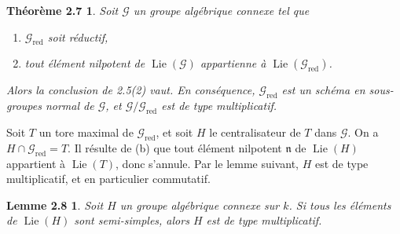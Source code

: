 \documentclass[11pt]{article}
\newcommand{\Lie}{\operatorname{Lie}}
\newcommand{\red}{\mathrm{red}}
\newtheorem*{theoreme27}{Théorème 2.7}
\newtheorem*{lemme28}{Lemme 2.8}
\begin{document}
\begin{theoreme27}
Soit \(\mathcal G\) un groupe algébrique connexe tel que
\begin{enumerate}[label=(\alph*),leftmargin=2em]
\item \(\mathcal G_{\red}\) soit réductif,
\item tout élément nilpotent de \(\Lie(\mathcal G)\) appartienne à
\(\Lie(\mathcal G_{\red})\).
\end{enumerate}
Alors la conclusion de 2.5(2) vaut. En conséquence,
\(\mathcal G_{\red}\) est un schéma en sous-groupes normal de \(\mathcal G\), et
\(\mathcal G/\mathcal G_{\red}\) est de type multiplicatif.
\end{theoreme27}

Soit \(T\) un tore maximal de \(\mathcal G_{\red}\), et soit \(H\) le centralisateur de
\(T\) dans \(\mathcal G\). On a \(H\cap\mathcal G_{\red}=T\). Il résulte de (b) que
tout élément nilpotent \(\mathfrak n\) de \(\Lie(H)\) appartient à \(\Lie(T)\), donc
s'annule. Par le lemme suivant, \(H\) est de type multiplicatif, et en particulier
commutatif.

\begin{lemme28}
Soit \(H\) un groupe algébrique connexe sur \(k\). Si tous les éléments de \(\Lie(H)\)
sont semi-simples, alors \(H\) est de type multiplicatif.
\end{lemme28}
\end{document}
